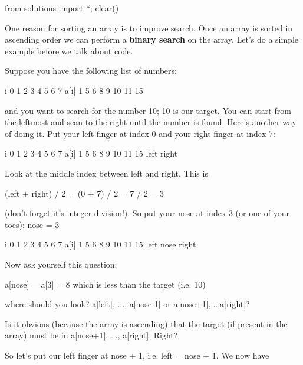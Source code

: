 \begin{python0}
from solutions import *; clear()
\end{python0}

One reason for sorting an array is to improve search. Once an array is
sorted in ascending order we can perform a \textbf{binary search} on the
array. Let's do a simple example before we talk about
code.

Suppose you have the following list of numbers:

\begin{consolethree}[escapeinside=||]
i      0    1    2    3    4    5    6    7
a[i]   1    5    6    8    9    10   11   15
\end{consolethree}

and you want to search for the number 10; 10 is our target. You can
start from the leftmost and scan to the right until the number is found.
Here's another way of doing it. Put your left finger at
index 0 and your right finger at index 7:

\begin{consolethree}[escapeinside=||]
i      0    1    2    3    4    5    6    7
a[i]   1    5    6    8    9    10   11   15
    left                                  right
\end{consolethree}

Look at the middle index between left and right. This is

(left + right) / 2 = (0 + 7) / 2 = 7 / 2 = 3

(don't forget it's integer division!). So put your nose at index 3 (or one of your toes): nose = 3

\begin{consolethree}[escapeinside=||]
i      0    1    2    3    4    5    6    7
a[i]   1    5    6    8    9    10   11   15
    left            nose                  right
\end{consolethree}

Now ask yourself this question:

a[nose] = a[3] = 8 which is less than the target (i.e. 10)

where should you look? a[left], ..., a[nose-1] or a[nose+1],...,a[right]?

Is it obvious (because the array is ascending) that the target (if present in the array) must be in a[nose+1], ..., a[right]. Right?

So let's put our left finger at nose + 1, i.e. left = nose + 1. We now have

